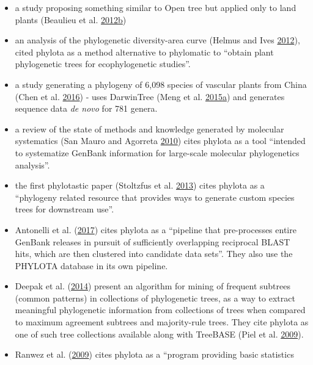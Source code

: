 \documentclass[]{article}
\begin{document}
\begin{enumerate}
\begin{itemize}
  \item
    a study proposing something similar to Open tree but applied only to land plants (Beaulieu et al. \protect\hyperlink{ref-beaulieu2012synthesizing}{2012}\protect\hyperlink{ref-beaulieu2012synthesizing}{b})
  \item
    an analysis of the phylogenetic diversity-area curve (Helmus and Ives \protect\hyperlink{ref-helmus2012phylogenetic}{2012}),
    cited phylota as a method alternative to phylomatic to ``obtain plant phylogenetic
    trees for ecophylogenetic studies''.
  \item
    a study generating a phylogeny of 6,098 species of vascular plants from China
    (Chen et al. \protect\hyperlink{ref-chen2016tree}{2016}) - uses DarwinTree (Meng et al. \protect\hyperlink{ref-meng2015darwintree}{2015}\protect\hyperlink{ref-meng2015darwintree}{a}) and generates sequence
    data \emph{de novo} for 781 genera.
  \item
    a review of the state of methods and knowledge generated by molecular systematics
    (San Mauro and Agorreta \protect\hyperlink{ref-san2010molecular}{2010}) cites phylota as a tool ``intended to systematize GenBank information
    for large-scale molecular phylogenetics analysis''.
  \item
    the first phylotastic paper (Stoltzfus et al. \protect\hyperlink{ref-stoltzfus2013phylotastic}{2013}) cites phylota as a ``phylogeny
    related resource that provides ways to generate custom species trees for downstream use''.
  \item
    Antonelli et al. (\protect\hyperlink{ref-antonelli2017toward}{2017}) cites phylota as a ``pipeline that pre-processes entire GenBank
    releases in pursuit of sufficiently overlapping reciprocal BLAST hits, which are
    then clustered into candidate data sets''. They also use the PHYLOTA database in its
    own pipeline.
  \item
    Deepak et al. (\protect\hyperlink{ref-deepak2014evominer}{2014}) present an algorithm for mining of frequent subtrees (common patterns)
    in collections of phylogenetic trees, as a way to extract meaningful phylogenetic
    information from collections of trees when compared to maximum agreement subtrees
    and majority-rule trees. They cite phylota as one of such tree collections available
    along with TreeBASE (Piel et al. \protect\hyperlink{ref-piel2009treebase}{2009}).
  \item
    Ranwez et al. (\protect\hyperlink{ref-ranwez2009phyloexplorer}{2009}) cites phylota as a ``program providing basic statistics

\end{itemize}
\end{enumerate}
\end{document}
